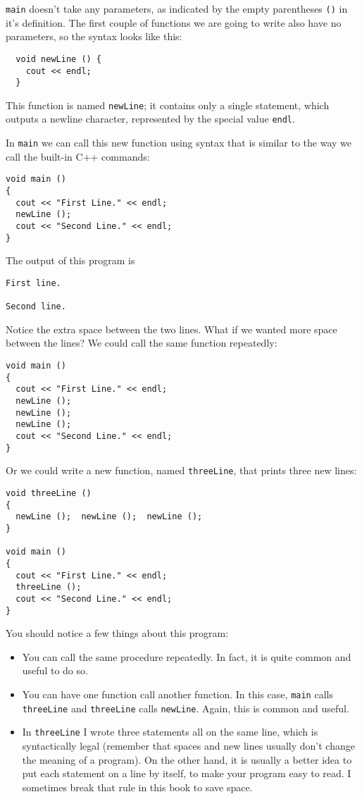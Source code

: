{\tt main} doesn't take any parameters, as indicated by
the empty parentheses {\tt ()} in it's definition.  The first couple
of functions we are going to write also have no parameters, so the
syntax looks like this:

\begin{verbatim}
  void newLine () {
    cout << endl;
  }
\end{verbatim}
%
This function is named {\tt newLine}; it contains only a single
statement, which outputs a newline character, represented by
the special value {\tt endl}.

In {\tt main} we can call this new function using syntax that
is similar to the way we call the built-in C++ commands:

\begin{verbatim}
void main ()
{
  cout << "First Line." << endl;
  newLine ();
  cout << "Second Line." << endl;
}
\end{verbatim}
%
The output of this program is

\begin{verbatim}
First line.

Second line.
\end{verbatim}
%
Notice the extra space between the two lines.  What if we wanted
more space between the lines?  We could call the same
function repeatedly:

\begin{verbatim}
void main ()
{
  cout << "First Line." << endl;
  newLine ();
  newLine ();
  newLine ();
  cout << "Second Line." << endl;
}
\end{verbatim}
%
Or we could write a new function, named {\tt threeLine}, that 
prints three new lines:

\begin{verbatim}
void threeLine ()
{
  newLine ();  newLine ();  newLine ();
}

void main ()
{
  cout << "First Line." << endl;
  threeLine ();
  cout << "Second Line." << endl;
}
\end{verbatim}
%
You should notice a few things about this program:

\begin{itemize}

\item You can call the same procedure repeatedly.  In
fact, it is quite common and useful to do so.

\item You can have one function call another function.  In this
case, {\tt main} calls {\tt threeLine} and {\tt threeLine}
calls {\tt newLine}.  Again, this is common and useful.

\item In {\tt threeLine} I wrote three statements all on the
same line, which is syntactically legal (remember that spaces
and new lines usually don't change the meaning of a program).
On the other hand, it is usually a better idea to put each
statement on a line by itself, to make your program easy to
read.  I sometimes break that rule in this book to save space.

\end{itemize}

